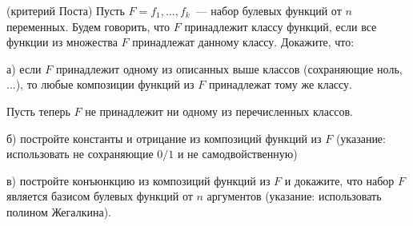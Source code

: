 \begin{task} (критерий Поста)
	Пусть $F = {f_1, \dots, f_k}$~--- набор булевых функций от $n$
    переменных. Будем говорить, что $F$ принадлежит классу функций,
    если все функции из множества $F$ принадлежат данному классу.
    Докажите, что:

	а) если $F$ принадлежит одному из описанных выше классов
    (сохраняющие ноль, ...), то любые
    композиции функций из $F$ принадлежат тому же классу.
    
    Пусть теперь $F$ не принадлежит ни одному из перечисленных
    классов.
    
    б) постройте константы и отрицание из композиций функций из $F$
    (указание: использовать не сохраняющие $0/1$ и не самодвойственную)

    в) постройте конъюнкцию из композиций функций из $F$ и докажите,
    что набор $F$ является базисом булевых функций от $n$ аргументов
    (указание: использовать полином Жегалкина).

\end{task}